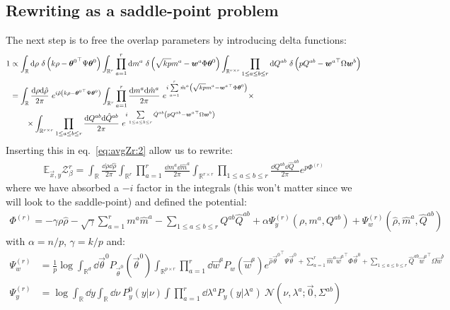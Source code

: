 \documentclass[11pt]{article}
\numberwithin{equation}{section}
\begin{document}
\subsection*{Rewriting as a saddle-point problem}
The next step is to free the overlap parameters by introducing delta functions:
\begin{align}
1&\propto \int_{\mathbb{R}}\text{d}\rho~\delta\left(k\rho - {\bm{\theta}^{0}}^{\top}\Psi\bm{\theta}^{0}\right)\int_{\mathbb{R}^{r}}\prod\limits_{a=1}^{r} \text{d} m^{a}~\delta\left(\sqrt{kp} m^{a}-\bm{w}^{a}\Phi\bm{\theta}^{0}\right)	
\int_{\mathbb{R}^{r\times r}}\prod\limits_{1\leq a\leq b\leq r}\text{d} Q^{ab}~\delta\left(p Q^{ab}-{\bm{w}^{a}}^{\top}\Omega\bm{w}^{b}\right)\notag\\
&=\int_{\mathbb{R}}\frac{\text{d}\rho\text{d}\hat{\rho}}{2\pi}~e^{i\hat{\rho}\left(k\rho - {\bm{\theta}^{0}}^{\top}\Psi\bm{\theta}^{0}\right)}\int_{\mathbb{R}^{r}}\prod\limits_{a=1}^{r} \frac{\text{d} m^{a}\text{d}\hat{m}^{a}}{2\pi}~e^{i\sum\limits_{a=1}^{r}\hat{m}^{a}\left(\sqrt{kp} m^{a}-{\bm{w}^{a}}^{\top}\Phi\bm{\theta}^{0}\right)}\times\notag\\
&\qquad\times\int_{\mathbb{R}^{r\times r}}\prod\limits_{1\leq a\leq b\leq r}\frac{\text{d} Q^{ab}\text{d}\hat{Q}^{ab}}{2\pi}~e^{i\sum\limits_{1\leq a\leq b\leq r}\hat{Q}^{ab}\left(p Q^{ab}-{\bm{w}^{a}}^{\top}\Omega\bm{w}^{b}\right)}
\end{align}
Inserting this in eq.~\eqref{eq:avgZr:2} allow us to rewrite:
\begin{align}
\mathbb{E}_{\vec{x},y}\mathcal{Z}_{\beta}^{r} = 	\int_{\mathbb{R}}\frac{\dd\rho\dd\hat{\rho}}{2\pi}\int_{\mathbb{R}^{r}}\prod\limits_{a=1}^{r} \frac{\dd m^{a}\dd\hat{m}^{a}}{2\pi}\int_{\mathbb{R}^{r\times r}}\prod\limits_{1\leq a\leq b\leq r}\frac{\dd Q^{ab}\dd\hat{Q}^{ab}}{2\pi} e^{p\Phi^{(r)}}
\label{eq:avgZr:3}
\end{align}
\noindent where we have absorbed a $-i$ factor in the integrals (this won't matter since we will look to the saddle-point) and defined the potential:
\begin{align}
\Phi^{(r)} = -\gamma \rho\hat{\rho}	-\sqrt{\gamma}\sum\limits_{a=1}^{r}m^{a}\hat{m}^{a}-\sum\limits_{1\leq a\leq b\leq r}Q^{ab}\hat{Q}^{ab}+\alpha\Psi^{(r)}_{y}(\rho,m^{a}, Q^{ab}) + \Psi^{(r)}_{w}(\hat{\rho},\hat{m}^{a},\hat{Q}^{ab})
\end{align}
\noindent with $\alpha = n/p$, $\gamma = k/p$ and:
\begin{align}
\Psi_{w}^{(r)} &= \frac{1}{p}\log\int_{\mathbb{R}^{d}}\dd\vec{\theta}^{0}P_{\vec{\theta}^{0}}\left(\vec{\theta}^{0}\right)\int_{\mathbb{R}^{p\times r}}\prod\limits_{a=1}^{r}\dd\vec{w}^{a}P_{w}\left(\vec{w}^{a}\right) e^{\hat{\rho}{\vec{\theta}^{0}}^{\top}\Psi\vec{\theta}^{0}+\sum\limits_{a=1}^{r}\hat{m}^{a}{\vec{w}^{a}}^{\top}\Phi\vec{\theta}^{0}+\sum\limits_{1\leq a\leq b\leq r}\hat{Q}^{ab}{\vec{w}^{a}}^{\top}\Omega\vec{w}^{b}}\\
\Psi_{y}^{(r)} &= \log\int_{\mathbb{R}}\dd y\int_{\mathbb{R}}\dd\nu~P_{y}^{0}(y|\nu)\int\prod\limits_{a=1}^{r}\dd\lambda^{a}P_{y}(y|\lambda^{a})~ \mathcal{N}(\nu,\lambda^{a};\vec{0},\Sigma^{ab})
\end{align}
\end{document}
